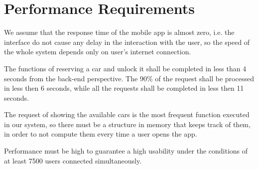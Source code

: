 \section{Performance Requirements}

We assume that the response time of the mobile app is almost zero, i.e. the interface do not cause any delay in the interaction with the user, so the speed of the whole system depends only on user's internet connection.

The functions of reserving a car and unlock it shall be completed in less than 4 seconds from the back-end perspective. The 90\% of the request shall be processed in less then 6 seconds, while all the requests shall be completed in less then 11 seconds.

The request of showing the available cars is the most frequent function executed in our system, so there must be a structure in memory that keeps track of them, in order to not compute them every time a user opens the app.

Performance must be high to guarantee a high usability under the conditions of at least 7500 users connected simultaneously.
